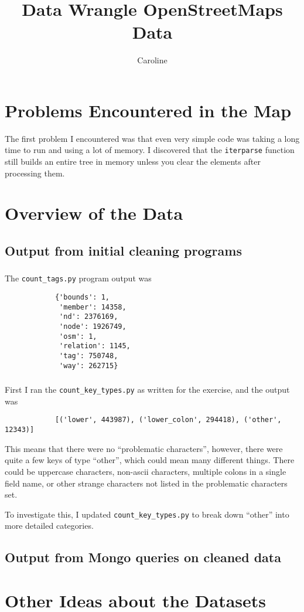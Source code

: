 \documentclass{article}
\author{Caroline}
\title{Data Wrangle OpenStreetMaps Data}
\begin{document}
    \maketitle
    \section{Problems Encountered in the Map}
        The first problem I encountered was that even very simple code was
        taking a long time to run and using a lot of memory. I discovered that
        the \texttt{iterparse} function still builds an entire tree in memory unless
        you clear the elements after processing them.
    \section{Overview of the Data}
        \subsection{Output from initial cleaning programs}
            \subsubsection{}
            The \texttt{count\_tags.py} program output was
            \begin{lstlisting}
            {'bounds': 1,
             'member': 14358,
             'nd': 2376169,
             'node': 1926749,
             'osm': 1,
             'relation': 1145,
             'tag': 750748,
             'way': 262715}
            \end{lstlisting}

            \subsubsection{}
            First I ran the \texttt{count\_key\_types.py} as written for the
            exercise, and the output was
            \begin{lstlisting}
            [('lower', 443987), ('lower_colon', 294418), ('other', 12343)]
            \end{lstlisting}
            This means that there were no ``problematic characters'', however,
            there were quite a few keys of type ``other'', which could mean many
            different things. There could be uppercase characters, non-ascii
            characters, multiple colons in a single field name, or other strange
            characters not listed in the problematic characters set.

            To investigate this, I updated \texttt{count\_key\_types.py} to
            break down ``other'' into more detailed categories.
        \subsection{Output from Mongo queries on cleaned data}
    \section{Other Ideas about the Datasets}
\end{document}
